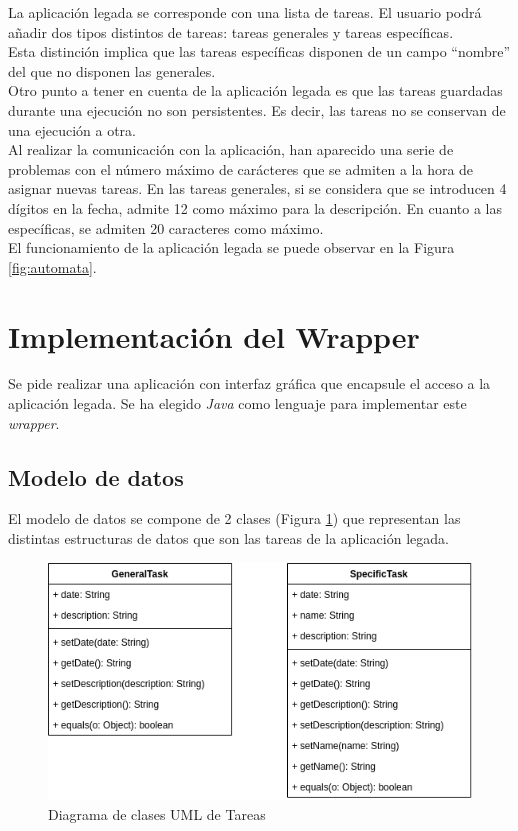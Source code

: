 \documentclass[10pt,a4paper]{article}
\begin{document}
La aplicación legada se corresponde con una lista de tareas. El usuario podrá añadir dos tipos distintos de tareas: tareas generales y tareas específicas.\\
Esta distinción implica que las tareas específicas disponen de un campo ``nombre'' del que no disponen las generales.\\
Otro punto a tener en cuenta de la aplicación legada es que las tareas guardadas durante una ejecución no son persistentes. Es decir, las tareas no se conservan de una ejecución a otra.\\
Al realizar la comunicación con la aplicación, han aparecido una serie de problemas con el número máximo de carácteres que se admiten a la hora de asignar nuevas tareas. En las tareas generales, si se considera que se introducen 4 dígitos en la fecha, admite 12 como máximo para la descripción. En cuanto a las específicas, se admiten 20 caracteres como máximo.\\
El funcionamiento de la aplicación legada se puede observar en la Figura \ref{fig:automata}.

\newpage
\section{Implementación del Wrapper}

Se pide realizar una aplicación con interfaz gráfica que encapsule el acceso a la aplicación legada. Se ha elegido \emph{Java} como lenguaje para implementar este \emph{wrapper}.

\subsection{Modelo de datos}

El modelo de datos se compone de 2 clases (Figura \ref{fig:tasks_class_diagram}) que representan las distintas estructuras de datos que son las tareas de la aplicación legada.

\begin{figure}[h!]
\centering
\includegraphics[scale=0.5]{images/class_diagram.png}
\caption{Diagrama de clases UML de Tareas}
\label{fig:tasks_class_diagram}
\end{figure}
\end{document}
